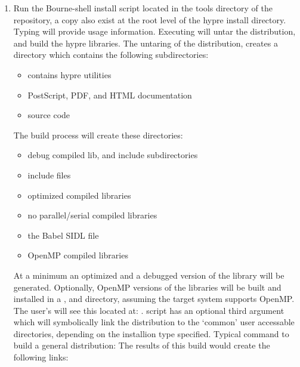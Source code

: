 \begin{enumerate}
   \item Run the Bourne-shell install script  located in 
   the tools directory of the \hypre{} repository, a copy also
   exist at the root level of the hypre install directory. Typing
    will provide usage information. Executing
    will untar the distribution, and build the hypre 
   libraries. The untaring of the distribution, creates a directory
    which contains the following subdirectories:
      \begin{itemize}
       \item {}     contains hypre utilities
       \item {}    PostScript, PDF, and HTML documentation
       \item {}     source code
      \end{itemize}
   The build process will create these directories:
      \begin{itemize}
       \item {}   debug compiled lib, and include subdirectories
       \item {} include files
       \item {}     optimized compiled libraries
       \item {}  no parallel/serial compiled libraries
       \item {}   the Babel SIDL file
       \item {} OpenMP compiled libraries
      \end{itemize}
   At a minimum an optimized and a debugged version of the library will
   be generated. Optionally, OpenMP versions of the libraries will
   be built and installed in a , and 
   directory, assuming the target system supports OpenMP. The
   user's will see this located at: .
    script has an optional third argument  which 
   will symbolically link the distribution to the `common' user
   accessable directories, depending on the installion type
   specified. Typical command to build a general distribution:\linebreak
   \linebreak
   The results of this build would create the following links:\linebreak
   \linebreak

\end{enumerate}
